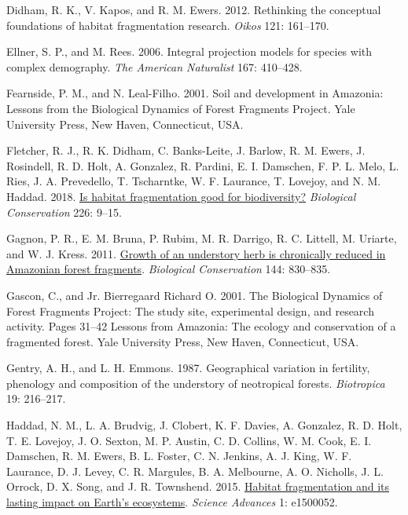 \documentclass[
  12pt,
  man, donotrepeattitle]{apa6}
\newlength{\cslhangindent}
\newlength{\cslentryspacingunit} %
\newenvironment{CSLReferences}[2] %
 {%
  \setlength{\parindent}{0pt}
  \ifodd #1
  \let\oldpar\par
  \def\par{\hangindent=\cslhangindent\oldpar}
  \fi
  \setlength{\parskip}{#2\cslentryspacingunit}
 }%
 {}
\begin{document}
\begin{CSLReferences}{1}{0}
\leavevmode{}%
Didham, R. K., V. Kapos, and R. M. Ewers. 2012. Rethinking the conceptual foundations of habitat fragmentation research. \emph{Oikos} 121: 161--170.

\leavevmode{}%
Ellner, S. P., and M. Rees. 2006. Integral projection models for species with complex demography. \emph{The American Naturalist} 167: 410--428.

\leavevmode{}%
Fearnside, P. M., and N. Leal-Filho. 2001. Soil and development in {Amazonia}: {Lessons} from the {Biological} {Dynamics} of {Forest} {Fragments} {Project}. Yale University Press, New Haven, Connecticut, USA.

\leavevmode{}%
Fletcher, R. J., R. K. Didham, C. Banks-Leite, J. Barlow, R. M. Ewers, J. Rosindell, R. D. Holt, A. Gonzalez, R. Pardini, E. I. Damschen, F. P. L. Melo, L. Ries, J. A. Prevedello, T. Tscharntke, W. F. Laurance, T. Lovejoy, and N. M. Haddad. 2018. \href{https://doi.org/10.1016/j.biocon.2018.07.022}{Is habitat fragmentation good for biodiversity?} \emph{Biological Conservation} 226: 9--15.

\leavevmode{}%
Gagnon, P. R., E. M. Bruna, P. Rubim, M. R. Darrigo, R. C. Littell, M. Uriarte, and W. J. Kress. 2011. \href{https://doi.org/10.1016/j.biocon.2010.11.015}{Growth of an understory herb is chronically reduced in {Amazonian} forest fragments}. \emph{Biological Conservation} 144: 830--835.

\leavevmode{}%
Gascon, C., and Jr. Bierregaard Richard O. 2001. The {Biological} {Dynamics} of {Forest} {Fragments} {Project}: The study site, experimental design, and research activity. Pages 31--42 Lessons from {Amazonia}: The ecology and conservation of a fragmented forest. Yale University Press, New Haven, Connecticut, USA.

\leavevmode{}%
Gentry, A. H., and L. H. Emmons. 1987. Geographical variation in fertility, phenology and composition of the understory of neotropical forests. \emph{Biotropica} 19: 216--217.

\leavevmode{}%
Haddad, N. M., L. A. Brudvig, J. Clobert, K. F. Davies, A. Gonzalez, R. D. Holt, T. E. Lovejoy, J. O. Sexton, M. P. Austin, C. D. Collins, W. M. Cook, E. I. Damschen, R. M. Ewers, B. L. Foster, C. N. Jenkins, A. J. King, W. F. Laurance, D. J. Levey, C. R. Margules, B. A. Melbourne, A. O. Nicholls, J. L. Orrock, D. X. Song, and J. R. Townshend. 2015. \href{https://doi.org/10.1126/sciadv.1500052}{Habitat fragmentation and its lasting impact on {Earth}'s ecosystems}. \emph{Science Advances} 1: e1500052.


\end{CSLReferences}
\end{document}

